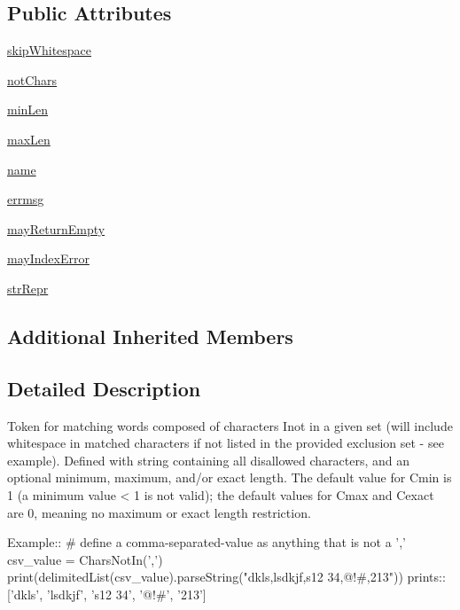 \subsection*{Public Attributes}
\begin{DoxyCompactItemize}
\item 
\hyperlink{classpkg__resources_1_1__vendor_1_1pyparsing_1_1CharsNotIn_a3edd456d47df6d465da27ef0ecbea6e2}{skip\+Whitespace}
\item 
\hyperlink{classpkg__resources_1_1__vendor_1_1pyparsing_1_1CharsNotIn_a34bbce664208b0ccb30cfec5a3d19dcb}{not\+Chars}
\item 
\hyperlink{classpkg__resources_1_1__vendor_1_1pyparsing_1_1CharsNotIn_a5edeaaa2b37fbc7ce4ba08b5008df364}{min\+Len}
\item 
\hyperlink{classpkg__resources_1_1__vendor_1_1pyparsing_1_1CharsNotIn_ab97609e9ce1d7abfb6276a7c67100fbf}{max\+Len}
\item 
\hyperlink{classpkg__resources_1_1__vendor_1_1pyparsing_1_1CharsNotIn_a78d60739095f187beff5ac1a3677ef9a}{name}
\item 
\hyperlink{classpkg__resources_1_1__vendor_1_1pyparsing_1_1CharsNotIn_a794b02795c2887de86157d92a8f84f2d}{errmsg}
\item 
\hyperlink{classpkg__resources_1_1__vendor_1_1pyparsing_1_1CharsNotIn_a26929ee2d2249b41f1742517f0df10f2}{may\+Return\+Empty}
\item 
\hyperlink{classpkg__resources_1_1__vendor_1_1pyparsing_1_1CharsNotIn_af8526d0f4d7360ddbc8962cdc3c8774e}{may\+Index\+Error}
\item 
\hyperlink{classpkg__resources_1_1__vendor_1_1pyparsing_1_1CharsNotIn_afae503e6fb98db119a00caa626ecf909}{str\+Repr}
\end{DoxyCompactItemize}
\subsection*{Additional Inherited Members}


\subsection{Detailed Description}
\begin{DoxyVerb}Token for matching words composed of characters I{not} in a given set (will
include whitespace in matched characters if not listed in the provided exclusion set - see example).
Defined with string containing all disallowed characters, and an optional
minimum, maximum, and/or exact length.  The default value for C{min} is 1 (a
minimum value < 1 is not valid); the default values for C{max} and C{exact}
are 0, meaning no maximum or exact length restriction.

Example::
    # define a comma-separated-value as anything that is not a ','
    csv_value = CharsNotIn(',')
    print(delimitedList(csv_value).parseString("dkls,lsdkjf,s12 34,@!#,213"))
prints::
    ['dkls', 'lsdkjf', 's12 34', '@!#', '213']
\end{DoxyVerb}
 

